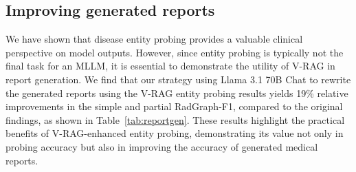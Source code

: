
\subsection{Improving generated reports}



We have shown that disease entity probing provides a valuable clinical perspective on model outputs. 
However, since entity probing is typically not the final task for an MLLM, it is essential to demonstrate the utility of V-RAG in report generation.
We find that our strategy using Llama 3.1 70B Chat to rewrite the
generated reports using the V-RAG entity probing results yields 19\% relative
improvements in the simple and partial RadGraph-F1, compared to
the original findings, as shown in Table~\ref{tab:reportgen}.
These results highlight the practical benefits of V-RAG-enhanced entity probing, demonstrating its value not only in probing accuracy but also in improving the accuracy of generated medical reports.

